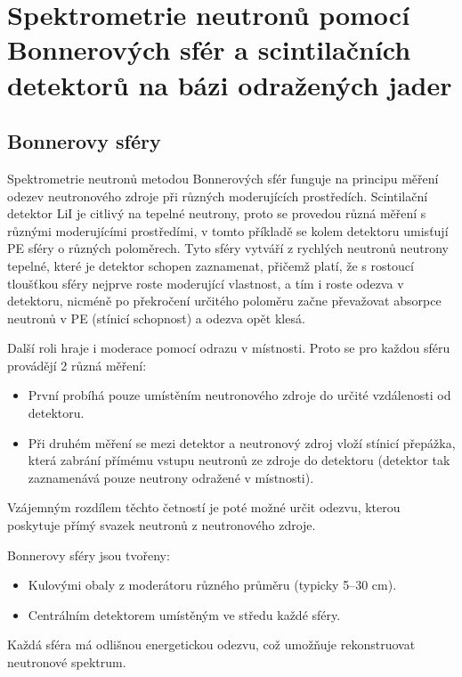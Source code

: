 \section[Spektrometrie neutronů]{Spektrometrie neutronů pomocí Bonnerových sfér a scintilačních detektorů na bázi odražených jader}

\subsection{Bonnerovy sféry}

Spektrometrie neutronů metodou Bonnerových sfér funguje na principu měření odezev neutronového zdroje při různých moderujících prostředích. Scintilační detektor LiI je citlivý na tepelné neutrony, proto se provedou různá měření s různými moderujícími prostředími, v tomto příkladě se kolem detektoru umisťují PE sféry o různých poloměrech. Tyto sféry vytváří z rychlých neutronů neutrony tepelné, které je detektor schopen zaznamenat, přičemž platí, že s rostoucí tloušťkou sféry nejprve roste moderující vlastnost, a tím i roste odezva v detektoru, nicméně po překročení určitého poloměru začne převažovat absorpce neutronů v PE (stínicí schopnost) a odezva opět klesá.

Další roli hraje i moderace pomocí odrazu v místnosti. Proto se pro každou sféru provádějí 2 různá měření:

\begin{itemize}
    \item První probíhá pouze umístěním neutronového zdroje do určité vzdálenosti od detektoru.
    \item Při druhém měření se mezi detektor a neutronový zdroj vloží stínicí přepážka, která zabrání přímému vstupu neutronů ze zdroje do detektoru (detektor tak zaznamenává pouze neutrony odražené v místnosti).  
\end{itemize}

Vzájemným rozdílem těchto četností je poté možné určit odezvu, kterou poskytuje přímý svazek neutronů z neutronového zdroje.

Bonnerovy sféry jsou tvořeny:

\begin{itemize}
    \item Kulovými obaly z moderátoru různého průměru (typicky 5--30 cm).
    \item Centrálním detektorem umístěným ve středu každé sféry.
\end{itemize}

Každá sféra má odlišnou energetickou odezvu, což umožňuje rekonstruovat neutronové spektrum.

